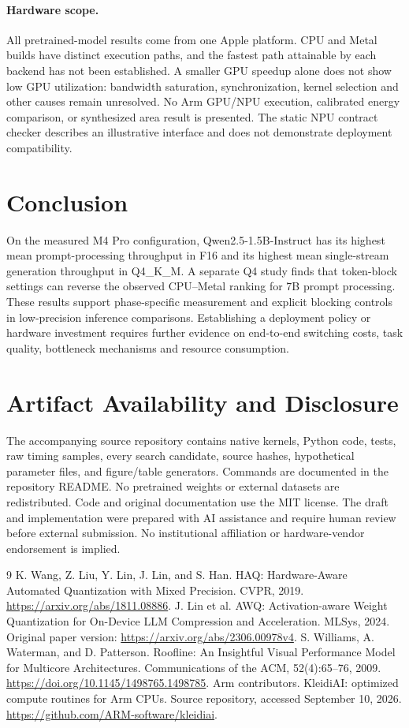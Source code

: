 \documentclass[11pt]{article}
\begin{document}
\paragraph{Hardware scope.}
All pretrained-model results come from one Apple platform. CPU and Metal builds
have distinct execution paths, and the fastest path attainable by each backend
has not been established. A smaller GPU speedup alone does not show low GPU
utilization: bandwidth saturation, synchronization, kernel selection and other
causes remain unresolved. No Arm GPU/NPU execution, calibrated energy comparison,
or synthesized area result is presented. The static NPU contract checker describes
an illustrative interface and does not demonstrate deployment compatibility.

\section{Conclusion}
On the measured M4 Pro configuration, Qwen2.5-1.5B-Instruct has its highest
mean prompt-processing throughput in F16 and its highest mean single-stream
generation throughput in Q4\_K\_M. A separate Q4 study finds that token-block
settings can reverse the observed CPU--Metal ranking for 7B prompt processing.
These results support phase-specific measurement and explicit blocking controls
in low-precision inference comparisons. Establishing a deployment policy or
hardware investment requires further evidence on end-to-end switching costs,
task quality, bottleneck mechanisms and resource consumption.

\section*{Artifact Availability and Disclosure}
The accompanying source repository contains native kernels, Python code, tests,
raw timing samples, every search candidate, source hashes, hypothetical parameter
files, and figure/table generators. Commands are documented in the repository
README. No pretrained weights or external datasets are redistributed. Code and
original documentation use the MIT license. The draft and implementation were
prepared with AI assistance and require human review before external submission.
No institutional affiliation or hardware-vendor endorsement is implied.

\begin{thebibliography}{9}
 K. Wang, Z. Liu, Y. Lin, J. Lin, and S. Han.
HAQ: Hardware-Aware Automated Quantization with Mixed Precision.
CVPR, 2019. \url{https://arxiv.org/abs/1811.08886}.
 J. Lin et al.
AWQ: Activation-aware Weight Quantization for On-Device LLM Compression and Acceleration.
MLSys, 2024. Original paper version:
\url{https://arxiv.org/abs/2306.00978v4}.
 S. Williams, A. Waterman, and D. Patterson.
Roofline: An Insightful Visual Performance Model for Multicore Architectures.
Communications of the ACM, 52(4):65--76, 2009.
\url{https://doi.org/10.1145/1498765.1498785}.
 Arm contributors. KleidiAI: optimized compute routines for Arm CPUs.
Source repository, accessed September 10, 2026.
\url{https://github.com/ARM-software/kleidiai}.
\end{thebibliography}
\end{document}
